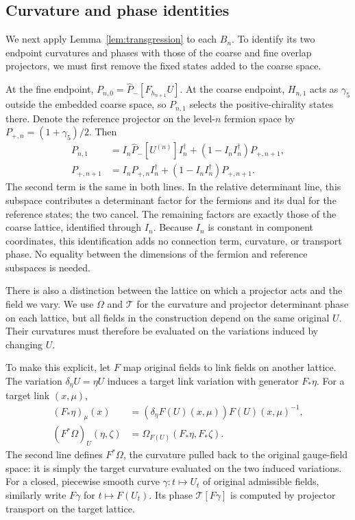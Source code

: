 \documentclass[11pt,a4paper]{article}
\theoremstyle{remark}
\begin{document}
\subsection{Curvature and phase identities}

We next apply Lemma~\ref{lem:transgression} to each $B_n$. To identify
its two endpoint curvatures and phases with those of the coarse and fine
overlap projectors, we must first remove the fixed states added to the
coarse space.

At the fine endpoint, $P_{n,0}=\widehat P_-[F_{h_{n+1}}U]$. At the
coarse endpoint, $H_{n,1}$ acts as $\gamma_5$ outside the embedded coarse
space, so $P_{n,1}$ selects the positive-chirality states there. Denote
the reference projector on the level-$n$ fermion space by
$P_{+,n}=(1+\gamma_5)/2$. Then
\begin{equation}
 \begin{split}
 P_{n,1}&=I_n\widehat P_-[U^{(n)}]I_n^\dagger
                 +(1-I_nI_n^\dagger)P_{+,n+1},\\
 P_{+,n+1}&=I_nP_{+,n}I_n^\dagger
                 +(1-I_nI_n^\dagger)P_{+,n+1}.
 \end{split}
\end{equation}
The second term is the same in both lines. In the relative determinant
line, this subspace contributes a determinant factor for the fermions
and its dual for the reference states; the two cancel. The remaining
factors are exactly those of the coarse lattice, identified through $I_n$.
Because $I_n$ is constant in component coordinates, this identification
adds no connection term, curvature, or transport phase. No equality
between the dimensions of the fermion and reference subspaces is needed.

There is also a distinction between the lattice on which a projector acts
and the field we vary. We use $\Omega$ and $\mathcal T$ for the curvature
and projector determinant phase on each lattice, but all fields in the
construction depend on the same original $U$. Their curvatures must
therefore be evaluated on the variations induced by changing $U$.

To make this explicit, let $F$ map original fields to link fields on
another lattice. The variation $\delta_\eta U=\eta U$ induces a target
link variation with generator $F_*\eta$. For a target link $(x,\mu)$,
\begin{equation}
 \begin{split}
 (F_*\eta)_\mu(x)
 &=(\delta_\eta F(U)(x,\mu))F(U)(x,\mu)^{-1},\\
 (F^*\Omega)_U(\eta,\zeta)
 &=\Omega_{F(U)}(F_*\eta,F_*\zeta).
 \end{split}
\end{equation}
The second line defines $F^*\Omega$, the curvature pulled back to the
original gauge-field space: it is simply the target curvature evaluated
on the two induced variations. For a closed, piecewise smooth curve
$\gamma:t\mapsto U_t$ of original admissible fields, similarly write
$F\gamma$ for $t\mapsto F(U_t)$. Its phase $\mathcal T[F\gamma]$ is
computed by projector transport on the target lattice.
\end{document}
